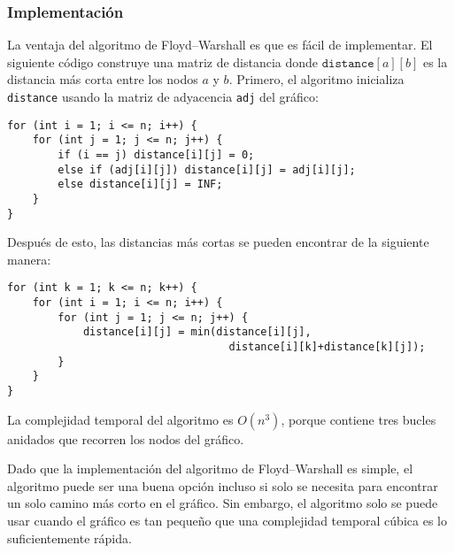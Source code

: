 \subsubsection{Implementación}

La ventaja del
algoritmo de Floyd–Warshall es que es
fácil de implementar.
El siguiente código construye una
matriz de distancia donde $\texttt{distance}[a][b]$
es la distancia más corta entre los nodos $a$ y $b$.
Primero, el algoritmo inicializa \texttt{distance}
usando la matriz de adyacencia \texttt{adj} del gráfico:

\begin{lstlisting}
for (int i = 1; i <= n; i++) {
    for (int j = 1; j <= n; j++) {
        if (i == j) distance[i][j] = 0;
        else if (adj[i][j]) distance[i][j] = adj[i][j];
        else distance[i][j] = INF;
    }
}
\end{lstlisting}
Después de esto, las distancias más cortas se pueden encontrar de la siguiente manera:
\begin{lstlisting}
for (int k = 1; k <= n; k++) {
    for (int i = 1; i <= n; i++) {
        for (int j = 1; j <= n; j++) {
            distance[i][j] = min(distance[i][j],
                                   distance[i][k]+distance[k][j]);
        }
    }
}
\end{lstlisting}

La complejidad temporal del algoritmo es $O(n^3)$,
porque contiene tres bucles anidados
que recorren los nodos del gráfico.

Dado que la implementación del algoritmo de Floyd–Warshall
es simple, el algoritmo puede ser
una buena opción incluso si solo se necesita para encontrar un
solo camino más corto en el gráfico.
Sin embargo, el algoritmo solo se puede usar cuando el gráfico
es tan pequeño que una complejidad temporal cúbica es lo suficientemente rápida.
